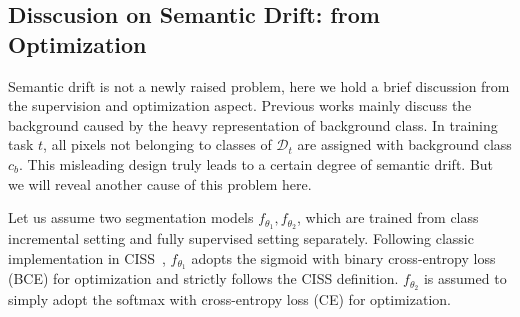 




\iffalse
\subsection{Disscusion on Semantic Drift: from Optimization}
Semantic drift is not a newly raised problem, here we hold a brief discussion from the supervision and optimization aspect.
Previous works mainly discuss the background caused by the heavy representation of background class. In training task $t$, all pixels not belonging to classes of $\mathcal{D}_t$ are assigned with background class $c_b$. This misleading design truly leads to a certain degree of semantic drift. But we will reveal another cause of this problem here.

\vspace{20pt}
Let us assume two segmentation models $f_{\theta_1}, f_{\theta_2}$, which are trained from class incremental setting and fully supervised setting separately. Following classic implementation in CISS~\citep{SSUL_cha2021ssul,coinseg_zhang2023coinseg,microseg_zhang2022mining}, $f_{\theta_1}$ adopts the sigmoid with binary cross-entropy loss (BCE) for optimization and strictly follows the CISS definition. $f_{\theta_2}$ is assumed to simply adopt the softmax with cross-entropy loss (CE) for optimization.

